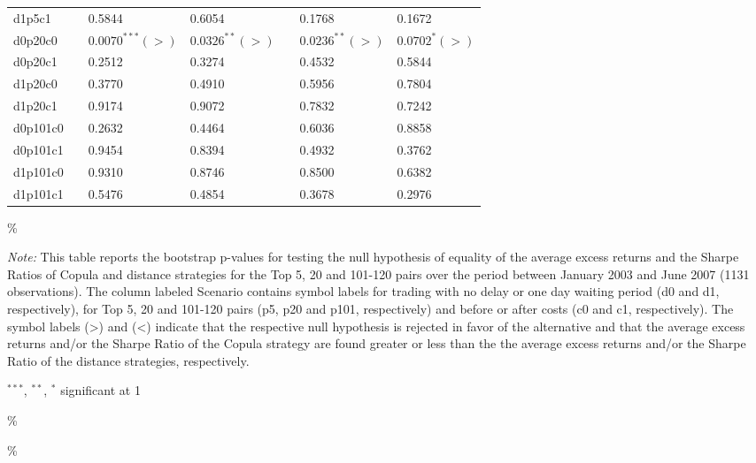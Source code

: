 \documentclass[a4paper]{article}
\begin{document}
\begin{threeparttable}[H]
\begin{tabularx}{\textwidth}{@{\extracolsep{\fill}}lllllll@{}}
			d1p5c1 & & 0.5844 & 0.6054 &       & 0.1768 & 0.1672 \\
			d0p20c0 & & $0.0070^{***}(>)$ & $0.0326^{**}(>)$ &       & $0.0236^{**}(>)$ & $0.0702^{*}(>)$ \\
			d0p20c1 & & 0.2512 & 0.3274 &       & 0.4532 & 0.5844 \\
			d1p20c0 & & 0.3770 & 0.4910 &       & 0.5956 & 0.7804 \\
			d1p20c1 & & 0.9174 & 0.9072 &       & 0.7832 & 0.7242 \\
			d0p101c0 & & 0.2632 & 0.4464 &       & 0.6036 & 0.8858 \\
			d0p101c1 & & 0.9454 & 0.8394 &       & 0.4932 & 0.3762 \\
			d1p101c0 & & 0.9310 & 0.8746 &       & 0.8500 & 0.6382 \\
			d1p101c1 & & 0.5476 & 0.4854 &       & 0.3678 & 0.2976 \\
			\bottomrule
		\end{tabularx}\%
		\begin{tablenotes}
			\item \textit{Note:} \scriptsize This table reports the bootstrap p-values for testing the null hypothesis of equality of the average excess returns and the Sharpe Ratios of Copula and distance strategies for the Top 5, 20 and 101-120 pairs over the period between January 2003 and June 2007 (1131 observations). The column labeled Scenario contains symbol labels for trading with no delay or one day waiting period (d0 and d1, respectively), for Top 5, 20 and 101-120 pairs (p5, p20 and p101, respectively) and before or after costs (c0 and c1, respectively). The symbol labels (>) and (<) indicate that the respective null hypothesis is rejected in favor of the alternative and that the average excess returns and/or the Sharpe Ratio of the Copula strategy are found greater or less than the the average excess returns and/or the Sharpe Ratio of the distance strategies, respectively.
			\item \scriptsize $^{\ast\ast\ast}$, $^{\ast\ast}$, $^{\ast}$  significant at 1\\%
		\end{tablenotes}
		\label{tab:table123}\%
	\end{threeparttable}\%
	
	\medskip
	
\end{document}
